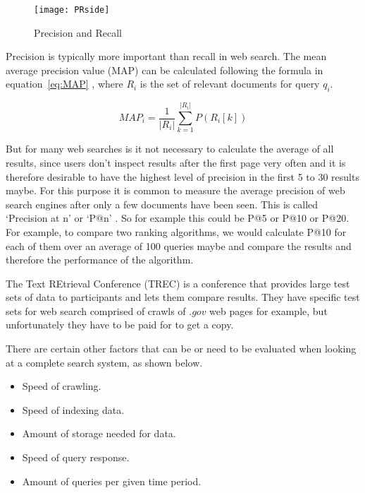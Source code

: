 \begin{figure}[!htbp]
  \centering
  \texttt{[image: PRside]}
  \caption[Precision and Recall]{Precision and Recall \autocite{Wikimedia2014}}
\label{fig:PR}
\end{figure}

Precision is typically more important than recall in web search. The mean average precision value (MAP) can be calculated following the formula in equation~\ref{eq:MAP}\marginnote{$\bm{\Sigma}$~\ref{eq:MAP}} \autocite[p.141]{Baeza-Yates2011}, where $R_i$ is the set of relevant documents for query $q_i$.

\begin{equation}
  MAP_i = \frac{1}{|R_i|} \sum_{k=1}^{|R_i|} P(R_i[k])
\label{eq:MAP}
\end{equation}

But for many web searches is it not necessary to calculate the average of all results, since users don't inspect results after the first page very often and it is therefore desirable to have the highest level of precision in the first \num{5} to \num{30} results maybe. For this purpose it is common to measure the average precision of web search engines after only a few documents have been seen. This is called `Precision at n' or `P@n' \autocite[p.140]{Baeza-Yates2011}. So for example this could be P@5 or P@10 or P@20. For example, to compare two ranking algorithms, we would calculate P@10 for each of them over an average of \num{100} queries maybe and compare the results and therefore the performance of the algorithm.

The Text REtrieval Conference (TREC) \autocite{Nist2016} is a conference that provides large test sets of data \autocite{Trec2011} to participants and lets them compare results. They have specific test sets for web search comprised of crawls of $.gov$ web pages for example, but unfortunately they have to be paid for to get a copy.

There are certain other factors that can be or need to be evaluated when looking at a complete search system, as shown below.

\begin{itemize}
  \item Speed of crawling.
  \item Speed of indexing data.
  \item Amount of storage needed for data.
  \item Speed of query response.
  \item Amount of queries per given time period.
\end{itemize}

